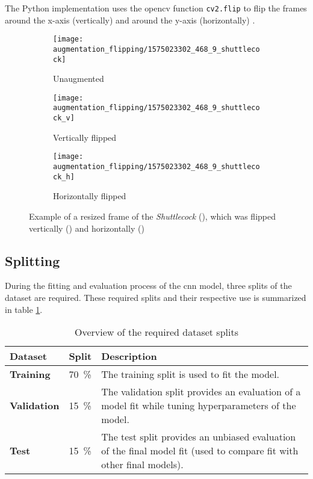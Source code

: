 The Python implementation uses the \acrshort{opencv} function \texttt{cv2.flip} to flip the frames around the x-axis (vertically) and around the y-axis (horizontally) \cite{training_opencv_flip}.

\begin{figure}
  \centering
  \begin{subfigure}[b]{0.3\textwidth}
    \centering
    \texttt{[image: augmentation\_flipping/1575023302\_468\_9\_shuttlecock]}
    \caption{Unaugmented}
    \label{subfig:af_resized}
  \end{subfigure}
  \begin{subfigure}[b]{0.3\textwidth}
    \centering
    \texttt{[image: augmentation\_flipping/1575023302\_468\_9\_shuttlecock\_v]}
    \caption{Vertically flipped}
    \label{subfig:af_vertical}
  \end{subfigure}
  \begin{subfigure}[b]{0.3\textwidth}
    \centering
    \texttt{[image: augmentation\_flipping/1575023302\_468\_9\_shuttlecock\_h]}
    \caption{Horizontally flipped}
    \label{subfig:af_horizontal}
  \end{subfigure}
  \caption{Example of a resized frame of the \textit{Shuttlecock} (), which was flipped vertically () and horizontally ()}
  \label{fig:augmentation_flipping}
\end{figure}

\subsection{Splitting}
\label{subsec:training_of_the_cnn:dataset:splitting}
During the fitting and evaluation process of the \acrshort{cnn} model, three splits of the dataset are required.
These required splits and their respective use is summarized in table \ref{tab:dataset_splits}.

\begin{table}
  \caption{Overview of the required dataset splits \cite{training_datasets}}
  \label{tab:dataset_splits}
  \centering
  \begin{tabular}{llp{10cm}}
    \toprule
    \textbf{Dataset} & \textbf{Split} & \textbf{Description} \\
    \midrule
    \textbf{Training} & \SI{70}{\percent} & The training split is used to fit the model. \\
    \midrule
    \textbf{Validation} & \SI{15}{\percent} & The validation split provides an evaluation of a model fit while tuning hyperparameters of the model. \\
    \midrule
    \textbf{Test} & \SI{15}{\percent} & The test split provides an unbiased evaluation of the final model fit (used to compare fit with other final models). \\
    \bottomrule
  \end{tabular}
\end{table}

